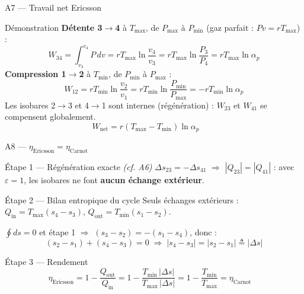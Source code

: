 \documentclass[aspectratio=43, 10pt]{beamer}
\newcommand{\Tmin}{T_{\min}}
\newcommand{\Tmax}{T_{\max}}
\newcommand{\Pmin}{P_{\min}}
\newcommand{\Pmax}{P_{\max}}
\newcommand{\rp}{\alpha_p}
\newcommand{\etaC}{\eta_{\text{Carnot}}}
\newcommand{\Wnet}{W_{\text{net}}}
\newcommand{\Qin}{Q_{\text{in}}}
\newcommand{\Qout}{Q_{\text{out}}}
\begin{document}
\begin{frame}{A7 --- Travail net Ericsson}

  \begin{block}{D\'emonstration}
    \textbf{D\'etente 3$\to$4} \`a $\Tmax$, de $\Pmax$ \`a $\Pmin$
    (gaz parfait : $Pv = r\Tmax$) :
    \[
      W_{34} = \int_{v_3}^{v_4} P\,dv
             = r\Tmax\ln\!\frac{v_4}{v_3}
             = r\Tmax\ln\!\frac{P_3}{P_4}
             = r\Tmax\ln\rp
    \]
    \textbf{Compression 1$\to$2} \`a $\Tmin$, de $\Pmin$ \`a $\Pmax$ :
    \[
      W_{12} = r\Tmin\ln\!\frac{v_2}{v_1}
             = r\Tmin\ln\!\frac{\Pmin}{\Pmax}
             = -r\Tmin\ln\rp
    \]
    Les isobares 2$\to$3 et 4$\to$1 sont internes (r\'eg\'en\'eration) :
    $W_{23}$ et $W_{41}$ se compensent globalement.
    \[
      \boxed{\Wnet = r(\Tmax-\Tmin)\ln\rp}
      \qquad
    \]
  \end{block}

\end{frame}

\begin{frame}{A8 --- $\eta_{\text{Ericsson}} = \etaC$}

  \begin{block}{\'Etape 1 --- R\'eg\'en\'eration exacte \textit{(cf. A6)}}
    \small
    $\Delta s_{23} = -\Delta s_{41}$
    $\Rightarrow$ $|Q_{23}| = |Q_{41}|$ :
    avec $\varepsilon = 1$, les isobares ne font
    \textbf{aucun \'echange ext\'erieur}.
  \end{block}

  \begin{block}{\'Etape 2 --- Bilan entropique du cycle}
    \small
    Seuls \'echanges ext\'erieurs :
    $\Qin = \Tmax(s_4-s_3)$, $\Qout = \Tmin(s_1-s_2)$.

    $\oint ds = 0$ et \'etape 1 $\Rightarrow$
    $(s_3-s_2) = -(s_1-s_4)$, donc :
    \[
      (s_2-s_1) + (s_4-s_3) = 0
      \;\Rightarrow\;
      |s_4-s_3| = |s_2-s_1| \triangleq |\Delta s|
    \]
  \end{block}

  \begin{block}{\'Etape 3 --- Rendement}
    \[
      \boxed{\eta_{\text{Ericsson}}
             = 1 - \frac{\Qout}{\Qin}
             = 1 - \frac{\Tmin\,|\Delta s|}{\Tmax\,|\Delta s|}
             = 1 - \frac{\Tmin}{\Tmax}
             = \etaC}
      \quad
    \]
  \end{block}

\end{frame}
\end{document}

